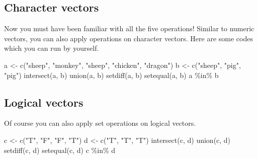 \documentclass[
]{book}
\newenvironment{Shaded}{\begin{snugshade}}{\end{snugshade}}
\newcommand{\FunctionTok}[1]{\textcolor[rgb]{0.00,0.00,0.00}{#1}}
\newcommand{\NormalTok}[1]{#1}
\newcommand{\OtherTok}[1]{\textcolor[rgb]{0.56,0.35,0.01}{#1}}
\newcommand{\SpecialCharTok}[1]{\textcolor[rgb]{0.00,0.00,0.00}{#1}}
\newcommand{\StringTok}[1]{\textcolor[rgb]{0.31,0.60,0.02}{#1}}
\begin{document}
\hypertarget{character-vectors-1}{%
\subsection{Character vectors}\label{character-vectors-1}}

Now you must have been familiar with all the five operations! Similar to numeric vectors, you can also apply operations on character vectors. Here are some codes which you can run by yourself.

\begin{Shaded}
\begin{Highlighting}[]
\NormalTok{a }\OtherTok{\textless{}{-}} \FunctionTok{c}\NormalTok{(}\StringTok{"sheep"}\NormalTok{, }\StringTok{"monkey"}\NormalTok{, }\StringTok{"sheep"}\NormalTok{, }\StringTok{"chicken"}\NormalTok{, }\StringTok{"dragon"}\NormalTok{)}
\NormalTok{b }\OtherTok{\textless{}{-}} \FunctionTok{c}\NormalTok{(}\StringTok{"sheep"}\NormalTok{, }\StringTok{"pig"}\NormalTok{, }\StringTok{"pig"}\NormalTok{)}
\FunctionTok{intersect}\NormalTok{(a, b)}
\FunctionTok{union}\NormalTok{(a, b)}
\FunctionTok{setdiff}\NormalTok{(a, b)}
\FunctionTok{setequal}\NormalTok{(a, b)}
\NormalTok{a }\SpecialCharTok{\%in\%}\NormalTok{ b}
\end{Highlighting}
\end{Shaded}

\hypertarget{logical-vectors-1}{%
\subsection{Logical vectors}\label{logical-vectors-1}}

Of course you can also apply set operations on logical vectors.

\begin{Shaded}
\begin{Highlighting}[]
\NormalTok{c }\OtherTok{\textless{}{-}} \FunctionTok{c}\NormalTok{(}\StringTok{"T"}\NormalTok{, }\StringTok{"F"}\NormalTok{, }\StringTok{"F"}\NormalTok{, }\StringTok{"T"}\NormalTok{)}
\NormalTok{d }\OtherTok{\textless{}{-}} \FunctionTok{c}\NormalTok{(}\StringTok{"T"}\NormalTok{, }\StringTok{"T"}\NormalTok{, }\StringTok{"T"}\NormalTok{)}
\FunctionTok{intersect}\NormalTok{(c, d)}
\FunctionTok{union}\NormalTok{(c, d)}
\FunctionTok{setdiff}\NormalTok{(c, d)}
\FunctionTok{setequal}\NormalTok{(c, d)}
\NormalTok{c }\SpecialCharTok{\%in\%}\NormalTok{ d}
\end{Highlighting}
\end{Shaded}
\end{document}
